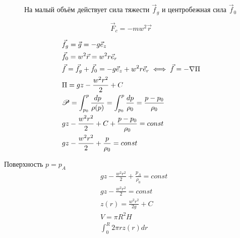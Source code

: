 \begin{figure}[h]
  \centering
   
  \caption{На малый объём действует сила тяжести $\vec f_g$ и центробежная сила $\vec f_0$}
\end{figure}
\[
  \vec{F}_c = -mw^2 \vec{r}
\]


\begin{align*}
  &\vec{f}_g = \vec{g} = -g \vec{e}_z \\
  &\vec{f}_0 = w^2 \vec{r} = w^2 r \vec{e}_r \\
  &\vec{f} = \vec{f}_g + \vec{f}_0 = -g\vec{e}_z + w^2 r \vec{e}_r \iff \vec{f} = -\nabla \Pi \\
  &\Pi = gz - \frac{w^2r^2}{2} + C\\
  &\P = \int_{p_0}^p \frac{dp}{\rho(p)} = \int_{p_0}^p  \frac{dp}{\rho_0} = \frac{p - p_0}{\rho_0}\\
  &gz - \frac{w^2r^2}{2} + C + \frac{p - p_0}{\rho_0} = const \\
  &gz - \frac{w^2r^2}{2} + \frac{p}{\rho_0} = const
\end{align*}

Поверхность $p = p_A$
\begin{align*}
  &gz - \frac{w^2r^2}{2} + \frac{p_A}{\rho_0} = const \\
  &gz - \frac{w^2r^2}{2} = const \\
  &z(r) = \frac{w^2r^2}{2g} + C\\
  &V = \pi R^2 H \\
  &\int_0^R 2 \pi r z(r) dr
\end{align*}
